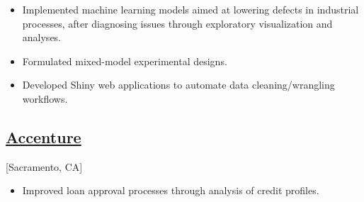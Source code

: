\documentclass{wm_cv}
\begin{document}
\begin{itemize}
  \item Implemented machine learning models aimed at lowering defects in industrial processes, after diagnosing issues through exploratory visualization and analyses.
  \item Formulated mixed-model experimental designs.
  \item Developed Shiny web applications to automate data cleaning/wrangling workflows.
\end{itemize} 

\subsection{\href{https://en.wikipedia.org/wiki/Accenture}{Accenture}}[Sacramento, CA]
\begin{positions}
\end{positions}

\begin{itemize}
  \item Improved loan approval processes through analysis of credit profiles. 
\end{itemize}







\end{document}
